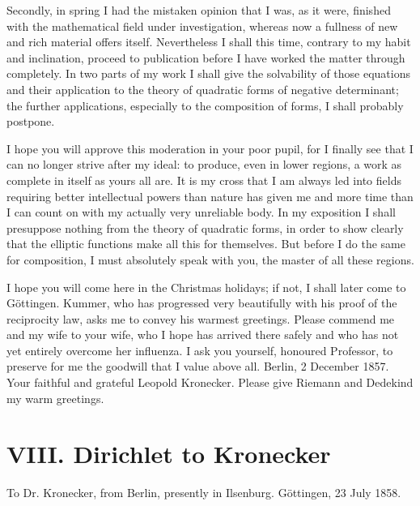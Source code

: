 \documentclass[11pt]{article}
\begin{document}
Secondly, in spring I had the mistaken opinion that I was, as it were, finished with the mathematical field under investigation, whereas now a fullness of new and rich material offers itself. Nevertheless I shall this time, contrary to my habit and inclination, proceed to publication before I have worked the matter through completely. In two parts of my work I shall give the solvability of those equations and their application to the theory of quadratic forms of negative determinant; the further applications, especially to the composition of forms, I shall probably postpone.

I hope you will approve this moderation in your poor pupil, for I finally see that I can no longer strive after my ideal: to produce, even in lower regions, a work as complete in itself as yours all are. It is my cross that I am always led into fields requiring better intellectual powers than nature has given me and more time than I can count on with my actually very unreliable body. In my exposition I shall presuppose nothing from the theory of quadratic forms, in order to show clearly that the elliptic functions make all this for themselves. But before I do the same for composition, I must absolutely speak with you, the master of all these regions.

I hope you will come here in the Christmas holidays; if not, I shall later come to Göttingen. Kummer, who has progressed very beautifully with his proof of the reciprocity law, asks me to convey his warmest greetings. Please commend me and my wife to your wife, who I hope has arrived there safely and who has not yet entirely overcome her influenza. I ask you yourself, honoured Professor, to preserve for me the goodwill that I value above all. Berlin, 2 December 1857. Your faithful and grateful Leopold Kronecker. Please give Riemann and Dedekind my warm greetings.

\section*{VIII. Dirichlet to Kronecker}
To Dr. Kronecker, from Berlin, presently in Ilsenburg. Göttingen, 23 July 1858.
\end{document}
